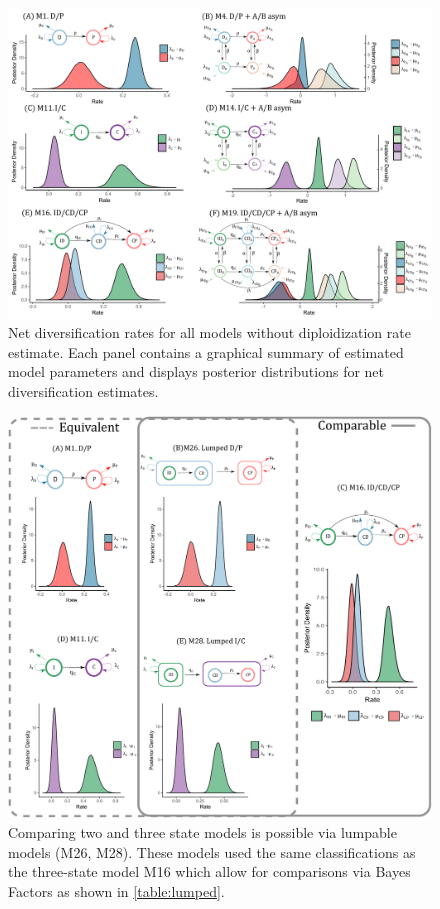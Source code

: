 \begin{figure}
\includegraphics[width=\textwidth]{alldiversificationasymhidden.pdf} 
\caption{Net diversification rates for all models without diploidization rate estimate. 
Each panel contains a graphical summary of estimated model parameters and displays posterior distributions for net diversification estimates.}
\label{figure:netdivall}
\end{figure}

\begin{figure}
\includegraphics[width=\textwidth]{lumped.pdf} %
\caption{Comparing two and three state models is possible via lumpable models (M26, M28). These models used the same classifications as the three-state model M16 which allow for comparisons via Bayes Factors as shown in \cref{table:lumped}.}  
\label{figure:lumped}
\end{figure}

